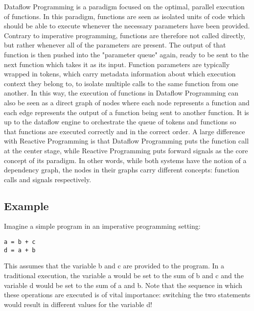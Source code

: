 Dataflow Programming is a paradigm focused on the optimal, parallel execution of functions. In this paradigm, functions are seen as isolated units of code which should be able to execute whenever the necessary parameters have been provided. Contrary to imperative programming, functions are therefore not called directly, but rather whenever all of the parameters are present. The output of that function is then pushed into the "parameter queue" again, ready to be sent to the next function which takes it as its input. Function parameters are typically wrapped in tokens, which carry metadata information about which execution context they belong to, to isolate multiple calls to the same function from one another. In this way, the execution of functions in Dataflow Programming can also be seen as a direct graph of nodes where each node represents a function and each edge represents the output of a function being sent to another function. It is up to the dataflow engine to orchestrate the queue of tokens and functions so that functions are executed correctly and in the correct order.
 A large difference with Reactive Programming is that Dataflow Programming puts the function call at the center stage, while Reactive Programming puts forward signals as the core concept of its paradigm. In other words, while both systems have the notion of a dependency graph, the nodes in their graphs carry different concepts: function calls and signals respectively.
 

\subsection{Example}

Imagine a simple program in an imperative programming setting:

\begin{lstlisting}
a = b + c
d = a + b
\end{lstlisting}

This assumes that the variable b and c are provided to the program.
In a traditional execution, the variable a would be set to the sum of b and c and the variable d would be set to the sum of a and b. Note that the sequence in which these operations are executed is of vital importance: switching the two statements would result in different values for the variable d!



